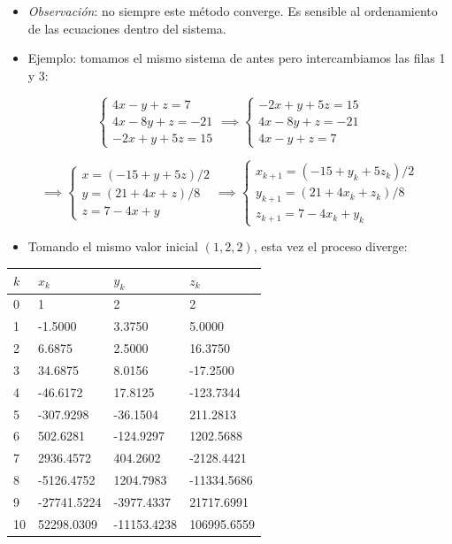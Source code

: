 \documentclass[openany]{book}
\providecommand{\tightlist}{%
  \setlength{\itemsep}{0pt}\setlength{\parskip}{0pt}}
\begin{document}
\begin{itemize}
\tightlist
\item
  \emph{Observación}: no siempre este método converge. Es sensible al ordenamiento de las ecuaciones dentro del sistema.
\item
  Ejemplo: tomamos el mismo sistema de antes pero intercambiamos las filas 1 y 3:
\end{itemize}

\[
\begin{cases} 
4x-y+z=7 \\
4x-8y+z=-21 \\
-2x+y+5z=15
\end{cases}
\implies
\begin{cases} 
-2x+y+5z=15 \\
4x-8y+z=-21 \\
4x-y+z=7
\end{cases}
\]

\[
\implies
\begin{cases} 
x=(-15+y+5z)/2 \\
y=(21+4x+z)/8 \\
z=7-4x+y
\end{cases}
\implies
\begin{cases} 
x_{k+1}=(-15+y_k+5z_k)/2 \\
y_{k+1}=(21+4x_k+z_k)/8 \\
z_{k+1}=7-4x_k+y_k
\end{cases}
\]

\begin{itemize}
\tightlist
\item
  Tomando el mismo valor inicial \((1, 2, 2)\), esta vez el proceso diverge:
\end{itemize}

\begin{longtable}[]{@{}llll@{}}
\toprule
\(k\) & \(x_k\) & \(y_k\) & \(z_k\)\tabularnewline
\midrule
\endhead
0 & 1 & 2 & 2\tabularnewline
1 & -1.5000 & 3.3750 & 5.0000\tabularnewline
2 & 6.6875 & 2.5000 & 16.3750\tabularnewline
3 & 34.6875 & 8.0156 & -17.2500\tabularnewline
4 & -46.6172 & 17.8125 & -123.7344\tabularnewline
5 & -307.9298 & -36.1504 & 211.2813\tabularnewline
6 & 502.6281 & -124.9297 & 1202.5688\tabularnewline
7 & 2936.4572 & 404.2602 & -2128.4421\tabularnewline
8 & -5126.4752 & 1204.7983 & -11334.5686\tabularnewline
9 & -27741.5224 & -3977.4337 & 21717.6991\tabularnewline
10 & 52298.0309 & -11153.4238 & 106995.6559\tabularnewline
\bottomrule
\end{longtable}
\end{document}
